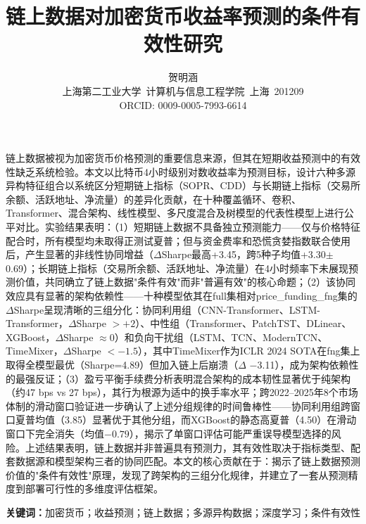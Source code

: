 \documentclass[12pt,a4paper]{ctexart}
\title{{\bfseries 链上数据对加密货币收益率预测的条件有效性研究}}
\author{贺明涵\\{\small 上海第二工业大学\ 计算机与信息工程学院\ 上海\ 201209}\\[2pt]{\small ORCID: 0009-0005-7993-6614}}
\date{}
\begin{document}
\maketitle

\begin{center}
{}
\end{center}

链上数据被视为加密货币价格预测的重要信息来源，但其在短期收益预测中的有效性缺乏系统检验。本文以比特币4小时级别对数收益率为预测目标，设计六种多源异构特征组合以系统区分短期链上指标（SOPR、CDD）与长期链上指标（交易所余额、活跃地址、净流量）的差异化贡献，在十种覆盖循环、卷积、Transformer、混合架构、线性模型、多尺度混合及树模型的代表性模型上进行公平对比。实验结果表明：（1）短期链上数据不具备独立预测能力——仅与价格特征配合时，所有模型均未取得正测试夏普；但与资金费率和恐慌贪婪指数联合使用后，产生显著的非线性协同增益（$\Delta$Sharpe最高+3.45，跨5种子均值+3.30$\pm$0.69）；长期链上指标（交易所余额、活跃地址、净流量）在4小时频率下未展现预测价值，共同确立了链上数据"条件有效"而非"普遍有效"的核心命题；（2）该协同效应具有显著的架构依赖性——十种模型依其在full集相对price\_funding\_fng集的$\Delta$Sharpe呈现清晰的三组分化：协同利用组（CNN-Transformer、LSTM-Transformer，$\Delta$Sharpe $> +2$）、中性组（Transformer、PatchTST、DLinear、XGBoost，$\Delta$Sharpe $\approx 0$）和负向干扰组（LSTM、TCN、ModernTCN、TimeMixer，$\Delta$Sharpe $< -1.5$），其中TimeMixer作为ICLR 2024 SOTA在fng集上取得全模型最优（Sharpe=4.89）但加入链上后崩溃（$\Delta$ $-$3.11），成为架构依赖性的最强反证；（3）盈亏平衡手续费分析表明混合架构的成本韧性显著优于纯架构（约47 bps vs 27 bps），其行为根源为适中的换手率水平；跨2022--2025年8个市场体制的滑动窗口验证进一步确认了上述分组规律的时间鲁棒性——协同利用组跨窗口夏普均值（3.85）显著优于其他分组，而XGBoost的静态高夏普（4.50）在滑动窗口下完全消失（均值$-0.79$），揭示了单窗口评估可能严重误导模型选择的风险。上述结果表明，链上数据并非普遍具有预测力，其有效性取决于指标类型、配套数据源和模型架构三者的协同匹配。本文的核心贡献在于：揭示了链上数据预测价值的"条件有效性"原理，发现了跨架构的三组分化规律，并建立了一套从预测精度到部署可行性的多维度评估框架。

\vspace{1em}
{\bfseries 关键词：}加密货币；收益预测；链上数据；多源异构数据；深度学习；条件有效性

\vspace{2em}
\end{document}

